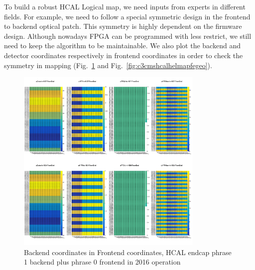 To build a robust HCAL Logical map, we need inputs from experts in different fields. For example, we need to follow a special symmetric design in the frontend to backend optical patch. This symmetry is highly dependent on the firmware design. Although nowadays FPGA can be programmed with less restrict, we still need to keep the algorithm to be maintainable. We also plot the backend and detector coordinates respectively in frontend coordinates in order to check the symmetry in mapping (Fig.~\ref{fig:c3cmshcalhelmapfebe} and Fig.~\ref{fig:c3cmshcalhelmapfegeo}).

\begin{figure}[htbp]
 \begin{center}
  \includegraphics[width=0.8\textwidth]{figures/c3/c3_cms_hcalhelmapfebe.png}
 \end{center}
 \caption{Backend coordinates in Frontend coordinates, HCAL endcap phrase 1 backend plus phrase 0 frontend in 2016 operation}
 \label{fig:c3cmshcalhelmapfebe}
\end{figure}

